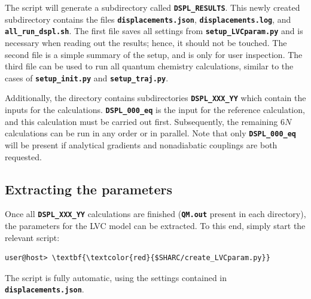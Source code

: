 \documentclass[a4paper,11pt,DIV=15,openany]{scrbook}
\newcommand{\ttt}[1]{\textbf{\texttt{#1}}}
\begin{document}
\normalsize
The script will generate a subdirectory called \ttt{DSPL\_RESULTS}.
This newly created subdirectory contains the files \ttt{displacements.json}, \ttt{displacements.log}, and \ttt{all\_run\_dspl.sh}.
The first file saves all settings from \ttt{setup\_LVCparam.py} and is necessary when reading out the results; hence, it should not be touched.
The second file is a simple summary of the setup, and is only for user inspection.
The third file can be used to run all quantum chemistry calculations, similar to the cases of \ttt{setup\_init.py} and \ttt{setup\_traj.py}.

Additionally, the directory contains subdirectories \ttt{DSPL\_XXX\_YY} which contain the inputs for the calculations.
\ttt{DSPL\_000\_eq} is the input for the reference calculation, and this calculation must be carried out first.
Subsequently, the remaining $6N$ calculations can be run in any order or in parallel.
Note that only \ttt{DSPL\_000\_eq} will be present if analytical gradients and nonadiabatic couplings are both requested.



\subsection{Extracting the parameters}

Once all \ttt{DSPL\_XXX\_YY} calculations are finished (\ttt{QM.out} present in each directory), the parameters for the LVC model can be extracted.
To this end, simply start the relevant script:
\begin{Verbatim}[commandchars=\\\{\}]
user@host> \textbf{\textcolor{red}{$SHARC/create_LVCparam.py}}
\end{Verbatim}
The script is fully automatic, using the settings contained in \ttt{displacements.json}.
\end{document}
